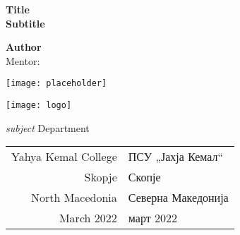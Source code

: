 \begin{titlepage}
	\begin{center}
    	\vspace*{1cm}
		
		\Huge
		\textbf{Title}\\
		\vspace{0.3cm}
		\LARGE
		\textbf{Subtitle}
		
		
		\vspace{2cm}
		
		\Large
		\textbf{Author}\\
		{Mentor: }
		
		\vspace{1.5cm}

		\texttt{[image: placeholder]}\\
		
		\vfill
		
		\texttt{[image: logo]}
		
		\vspace{0.25cm}
		
		\normalsize
	    \textit{subject} Department\\
		\begin{tabular}{ r | l }
            Yahya Kemal College & ПСУ „Јахја Кемал“\\
            Skopje & Скопје\\
            North Macedonia & Северна Македонија\\
            March 2022 & март 2022
        \end{tabular}
            
	\end{center}
\end{titlepage}